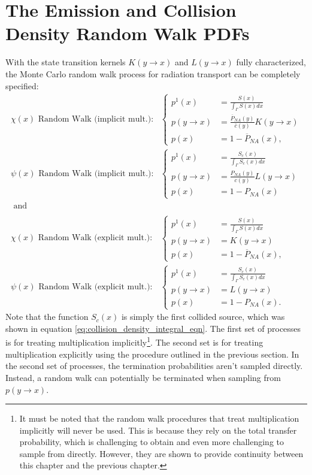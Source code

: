 \section{The Emission and Collision Density Random Walk PDFs}
With the state transition kernels $K(y \to x)$ and $L(y \to x)$ fully 
characterized, the Monte Carlo random walk process for radiation transport can 
be completely specified: 
\begin{align}
  \chi(x)\text{ Random Walk (implicit mult.):}&
  \begin{cases}
    p^1(x) & = \frac{S(x)}{\int_{\Gamma} S(x)dx} \\
    p(y \to x) &  = \frac{\overline{P}_{NA}(y)}{\bar{c}(y)}K(y \to x) \\
    p(x) & = 1 - \overline{P}_{NA}(x),
  \end{cases} \\
  \psi(x)\text{ Random Walk (implicit mult.):}&
  \begin{cases}
    p^1(x) & = \frac{S_c(x)}{\int_{\Gamma} S_c(x)dx} \\
    p(y \to x) & = \frac{P_{NA}(y)}{c(y)}L(y \to x) \\
    p(x) & = 1 - P_{NA}(x)
  \end{cases} \\
  \text{ and} \nonumber \\
  \nonumber \\
  \chi(x)\text{ Random Walk (explicit mult.):} &
  \begin{cases}
    p^1(x) & = \frac{S(x)}{\int_{\Gamma} S(x)dx} \\
    p(y \to x) &  = K(y \to x) \\
    p(x) & = 1 - \overline{P}_{NA}(x),
  \end{cases}
  \label{eq:mc_random_walk_emission_dens} \\
  \psi(x)\text{ Random Walk (explicit mult.):} &
  \begin{cases}
    p^1(x) & = \frac{S_c(x)}{\int_{\Gamma} S_c(x)dx} \\
    p(y \to x) & = L(y \to x) \\
    p(x) & = 1 - P_{NA}(x).
  \end{cases}
  \label{eq:mc_random_walk_collision_dens}
\end{align}
Note that the function $S_c(x)$ is simply the first collided source, which was
shown in equation \ref{eq:collision_density_integral_eqn}. The first set of 
processes is for treating multiplication implicitly\footnote{It must be noted 
that the random walk procedures that treat multiplication implicitly will never 
be used. This is because they rely on the total transfer probability, which is 
challenging to obtain and even more challenging to sample from directly. 
However, they are shown to provide continuity between this chapter and the 
previous chapter.}. The second set is for treating multiplication explicitly 
using the procedure outlined in the previous section. In the second set of 
processes, the termination probabilities aren't sampled directly. Instead, a 
random walk can potentially be terminated when sampling from $p(y \to x)$.


